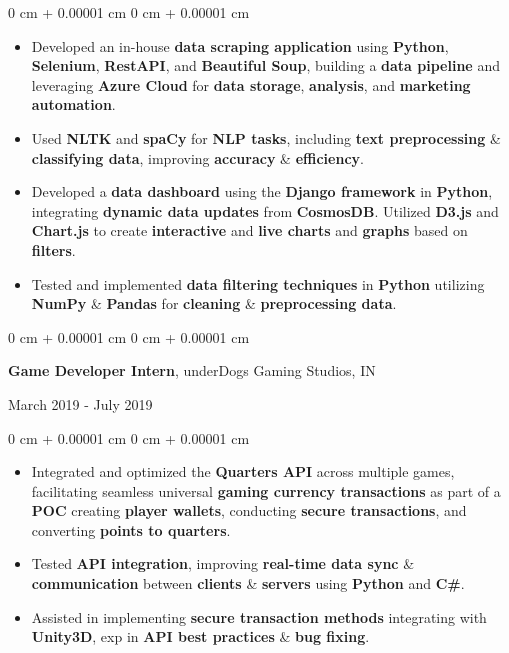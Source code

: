 \documentclass[10pt, letterpaper]{article}
\newenvironment{highlights}{
    \begin{itemize}[
        topsep=0.10 cm,
        parsep=0.10 cm,
        partopsep=0pt,
        itemsep=0pt,
        leftmargin=0 cm + 10pt
    ]
}{
    \end{itemize}
} %
\newenvironment{onecolentry}{
    \begin{adjustwidth}{
        0 cm + 0.00001 cm
    }{
        0 cm + 0.00001 cm
    }
}{
    \end{adjustwidth}
} %
\newenvironment{twocolentry}[2][]{
    \onecolentry
    \def\secondColumn{#2}
    \setcolumnwidth{\fill, 4.5 cm}
    \begin{paracol}{2}
}{
    \switchcolumn \raggedleft \secondColumn
    \end{paracol}
    \endonecolentry
} %
\begin{document}
    \begin{onecolentry}
        \begin{highlights}
            \item Developed an in-house \textbf{data scraping application} using \textbf{Python}, \textbf{Selenium}, \textbf{RestAPI}, and \textbf{Beautiful Soup}, building a \textbf{data pipeline} and leveraging \textbf{Azure Cloud} for \textbf{data storage}, \textbf{analysis}, and \textbf{marketing automation}.
            \item Used \textbf{NLTK} and \textbf{spaCy} for \textbf{NLP tasks}, including \textbf{text preprocessing} \& \textbf{classifying data}, improving \textbf{accuracy} \& \textbf{efficiency}.
            \item Developed a \textbf{data dashboard} using the \textbf{Django framework} in \textbf{Python}, integrating \textbf{dynamic data updates} from \textbf{CosmosDB}. Utilized \textbf{D3.js} and \textbf{Chart.js} to create \textbf{interactive} and \textbf{live charts} and \textbf{graphs} based on \textbf{filters}.
            \item Tested and implemented \textbf{data filtering techniques} in \textbf{Python} utilizing \textbf{NumPy} \& \textbf{Pandas} for \textbf{cleaning} \& \textbf{preprocessing data}.
        \end{highlights}
    \end{onecolentry}
    

    \vspace{0.10 cm}
    \begin{twocolentry}{
        March 2019 - July 2019
    }
        \textbf{Game Developer Intern}, underDogs Gaming Studios, IN
    \end{twocolentry}
    
    \begin{onecolentry}
        \begin{highlights}
            \item Integrated and optimized the \textbf{Quarters API} across multiple games, facilitating seamless universal \textbf{gaming currency transactions} as part of a \textbf{POC} creating \textbf{player wallets}, conducting \textbf{secure transactions}, and converting \textbf{points to quarters}.
            \item Tested \textbf{API integration}, improving \textbf{real-time data sync} \& \textbf{communication} between \textbf{clients} \& \textbf{servers} using \textbf{Python} and \textbf{C\#}.
            \item Assisted in implementing \textbf{secure transaction methods} integrating with \textbf{Unity3D}, exp in \textbf{API best practices} \& \textbf{bug fixing}.
        \end{highlights}
    \end{onecolentry}
    
\end{document}
